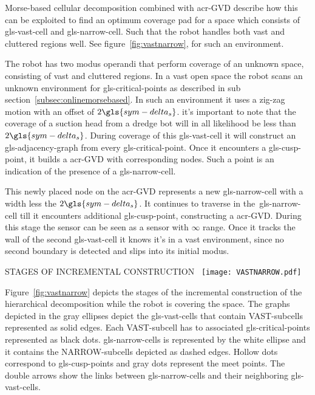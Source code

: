 Morse-based cellular decomposition combined with \gls{acr-GVD} describe how this can be exploited to find an
optimum coverage pad for a space which consists of \gls{gls-vast-cell} and \gls{gls-narrow-cell}. Such
that the robot handles both vast and cluttered regions well. See figure~\ref{fig:vastnarrow}, for such an environment.

The robot has two modus operandi that perform coverage of an unknown space, consisting of vast and cluttered regions. In
a vast open space the robot scans an unknown environment for \gls{gls-critical-point}s as described in sub
section~\ref{subsec:onlinemorsebased}. In such an environment it uses a zig-zag motion with an offset of \( 2
\gls{sym-delta_s}  \). it's important to note that the coverage of a suction head from a dredge bot will in all
likelihood be less than \( 2 \gls{sym-delta_s} \). During coverage of this \gls{gls-vast-cell} it will construct an
\gls{gls-adjacency-graph} from every \gls{gls-critical-point}. Once it encounters a \gls{gls-cusp-point}, it
builds a \gls{acr-GVD} with corresponding nodes. Such a point is an indication of the presence of a
\gls{gls-narrow-cell}.

This newly placed node on the \gls{acr-GVD} represents a new \gls{gls-narrow-cell} with a width less the \( 2
\gls{sym-delta_s} \). It continues to traverse in the~\gls{gls-narrow-cell} till it encounters additional
\gls{gls-cusp-point}, constructing a \gls{acr-GVD}. During this stage the sensor can be seen as a sensor with \( \infty
\) range. Once it tracks the wall of the second \gls{gls-vast-cell} it knows it's in a vast environment, since no
second boundary is detected and slips into its initial modus.

\begin{RoyalFigure}[!htb, label=fig:vastnarrow]{STAGES OF INCREMENTAL CONSTRUCTION~\cite{acar_complete_2001}}
    \texttt{[image: VASTNARROW.pdf]}
\end{RoyalFigure}

Figure~\ref{fig:vastnarrow} depicts the stages of the incremental construction of the hierarchical decomposition while
the robot is covering the space. The graphs depicted in the gray ellipses depict the \gls{gls-vast-cell}s that contain
VAST-subcells represented as solid edges. Each VAST-subcell has to associated
\gls{gls-critical-point}s represented as black dots. \gls{gls-narrow-cell}s is represented by the white ellipse and it
contains the NARROW-subcells depicted as dashed edges. Hollow dots correspond to \gls{gls-cusp-point}s
and gray dots represent the meet points. The double arrows show the links between \gls{gls-narrow-cell}s and their
neighboring \gls{gls-vast-cell}s.

